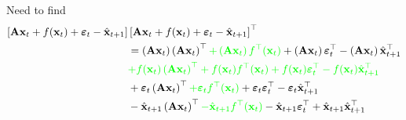 \documentclass[]{article}
\newcommand{\dean}[1]{\textcolor{green}{#1}}
\begin{document}
Need to find
\begin{align}
	\left[\mathbf{A}\mathbf{x}_t + f(\mathbf{x}_t) + \boldsymbol{\varepsilon}_t - \hat{\mathbf{x}}_{t+1}\right]&\left[\mathbf{A}\mathbf{x}_t + f(\mathbf{x}_t) + \boldsymbol{\varepsilon}_t - \hat{\mathbf{x}}_{t+1}\right]^{\top}\\ &= \left(\mathbf{A}\mathbf{x}_t\right)\left(\mathbf{A}\mathbf{x}_t\right)^{\top} \dean{+ \left(\mathbf{A}\mathbf{x}_t\right)f^{\top}(\mathbf{x}_t)} + \left(\mathbf{A}\mathbf{x}_t\right)\boldsymbol{\varepsilon}^{\top}_t - \left(\mathbf{A}\mathbf{x}_t\right) \hat{\mathbf{x}}_{t+1}^{\top} \\
	&\dean{+ f(\mathbf{x}_t)\left(\mathbf{A}\mathbf{x}_t\right)^{\top} + f(\mathbf{x}_t)f^{\top}(\mathbf{x}_t) + f(\mathbf{x}_t)\boldsymbol{\varepsilon}^{\top}_t - f(\mathbf{x}_t)\hat{\mathbf{x}}_{t+1}^{\top}} \\
	&+ \boldsymbol{\varepsilon}_t\left(\mathbf{A}\mathbf{x}_t\right)^{\top} \dean{+ \boldsymbol{\varepsilon}_tf^{\top}(\mathbf{x}_t)} + \boldsymbol{\varepsilon}_t\boldsymbol{\varepsilon}^{\top}_t - \boldsymbol{\varepsilon}_t\hat{\mathbf{x}}_{t+1}^{\top} \\
	&- \hat{\mathbf{x}}_{t+1}\left(\mathbf{A}\mathbf{x}_t\right)^{\top} \dean{- \hat{\mathbf{x}}_{t+1}f^{\top}(\mathbf{x}_t)} - \hat{\mathbf{x}}_{t+1}\boldsymbol{\varepsilon}^{\top}_t + \hat{\mathbf{x}}_{t+1}\hat{\mathbf{x}}_{t+1}^{\top} 
\end{align}



\end{document}
